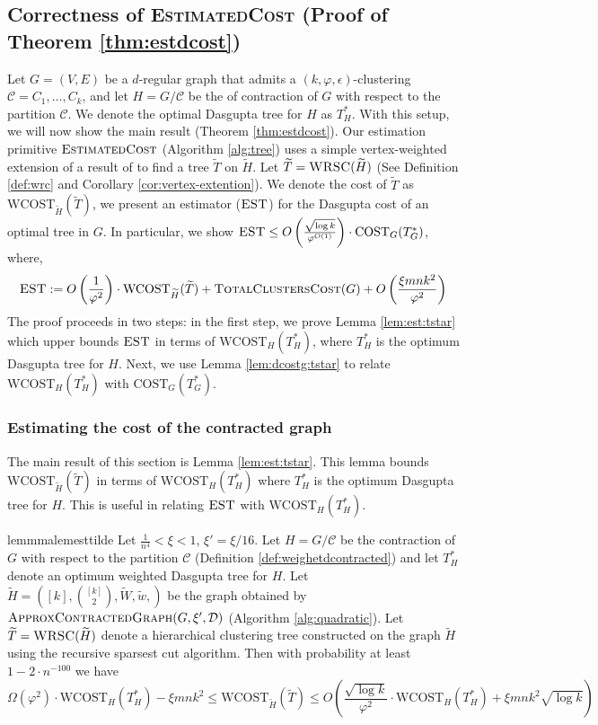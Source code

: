 \documentclass[letterpaper,11pt]{article}
\newcommand{\CT}{\text{COST}}
\newcommand{\wCT}{\text{WCOST}}
\newcommand{\est}{O\left(\frac{1}{\varphi^2}\right)\cdot  \wCT_{\wt{H}}(\wt{T}) + \textsc{TotalClustersCost}(G)+ O\left(\frac{\xi m n k^2 }{\varphi^2} \right) }
\newcommand{\eqdef}{:=}
\newcommand{\estg}{\textsc{EST}}
\newcommand{\cC}{\mathcal{C}}
\theoremstyle{plain}
\theoremstyle{definition}
\theoremstyle{remark}
\newcommand{\wt}[1]{\widetilde{#1}}
\begin{document}
 

\subsection{Correctness of \textsc{EstimatedCost} (Proof of Theorem \ref{thm:estdcost})} \label{sec:sketch:tree}
Let $G=(V,E)$ be a $d$-regular graph that admits a $(k,\varphi,\epsilon)$-clustering $\cC = C_1, \ldots , C_k$, and  let $H = G/\cC$ be the of contraction of $G$ with respect to the partition $\cC $. We denote the optimal Dasgupta tree for $H$ as $T^*_H$. With this setup,
we will now show the main result (Theorem \ref{thm:estdcost}). Our estimation primitive $\textsc{EstimatedCost}$ (Algorithm \ref{alg:tree}) uses a simple vertex-weighted extension of a result of \cite{charikar2017approximate}
to find a 
tree $\wt{T}$ on $\wt{H}$. 
Let $\widetilde{T}=\textsc{WRSC}(\widetilde{H})$ (See Definition \ref{def:wrc} and Corollary \ref{cor:vertex-extention}). We denote the cost of $\wt{T}$ as $\wCT_{\wt{H}}(\wt{T})$, we present an estimator ($\estg$) 
for the Dasgupta cost of an optimal tree in $G$. In particular, we show $\estg \leq O\left( \frac{\sqrt{\log k}}{\varphi^{O(1)}} \right) \cdot \CT_G(T^*_G)$, where,
$$\estg \eqdef \est $$
The proof proceeds in two steps: in the first step, we prove Lemma \ref{lem:est:tstar}
which upper bounds $\estg$ in terms of $\wCT_H(T^*_H)$, 
where $T^*_{H}$ is the optimum Dasgupta tree for $H$. 
Next, we use Lemma \ref{lem:dcostg:tstar} to relate $\wCT_H(T^*_H)$ with $\CT_G(T^*_G)$. 


\subsubsection{Estimating the cost of the contracted graph}
The main result of this section is Lemma \ref{lem:est:tstar}. This lemma bounds $\wCT_{\wt{H}}(\wt{T})$ in terms of $\wCT_H(T^*_H)$ where $T^*_H$ is the 
optimum Dasgupta tree for $H$. This is useful in relating $\estg$ with $\wCT_H(T^*_H)$. 

\begin{restatable}{lemmma}{lemesttilde} \label{lem:est:tstar}
Let $\frac{1}{n^4}<\xi<1$, $\xi'=\xi/16$. Let $H = G/\cC$ be the contraction of $G$ with respect to the partition $\cC $ (Definition \ref{def:weighetdcontracted}) and  let $T^*_H$ denote an optimum weighted Dasgupta tree for $H$.  Let $\widetilde{H}=\left([k], {[k] \choose 2}, \widetilde{W}, \widetilde{w}, \right)$ be the graph obtained by 
	$\textsc{ApproxContractedGraph}(G, \xi', \mathcal{D})$  (Algorithm \ref{alg:quadratic}). Let $\widetilde{T} = \textsc{WRSC}(\widetilde{H})$ denote a hierarchical clustering tree constructed on the graph $\widetilde{H}$ using the recursive sparsest cut algorithm. Then with probability at least $ 1-2\cdot n^{-100}$ we have
\[
\Omega\left(\varphi^2\right)\cdot \wCT_{H}(T^*_{H}) - \xi  m n k^2 \leq \wCT_{\wt{H}}(\widetilde{T}) \leq O\left( \frac{\sqrt{\log k}}{\varphi^2}\cdot \wCT_{H}(T^*_{H}) +  \xi  m n k^2 \sqrt{\log k} \right)
\]
\end{restatable}
\end{document}
